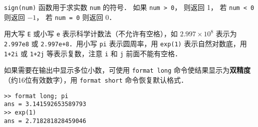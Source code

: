 \lstinline|sign(num)| 函数用于求实数 \lstinline|num| 的符号． 如果 \lstinline|num > 0|， 则返回 1， 若 \lstinline|num < 0| 则返回 $-1$， 若 \lstinline|num = 0| 则返回 0．

用大写 \lstinline|E| 或小写 \lstinline|e| 表示科学计数法（不允许有空格），如 $2.997\times 10^8$ 表示为 \lstinline|2.997e8| 或 \lstinline|2.997e+8|．用小写 \lstinline|pi| 表示圆周率，用 \lstinline|exp(1)| 表示自然对数底，用 \lstinline|1+2i| 或 \lstinline|1+2j| 等表示复数，注意 \lstinline|i| 和 \lstinline|j| 前面不能有空格．

如果需要在输出中显示多位小数，可使用 \lstinline|format long| 命令使结果显示为\textbf{双精度}（约16位有效数字），用 \lstinline|format short| 命令恢复默认格式．
\begin{lstlisting}[language=MatlabCom]
>> format long; pi
ans = 3.141592653589793
>> exp(1)
ans = 2.718281828459046
\end{lstlisting}
